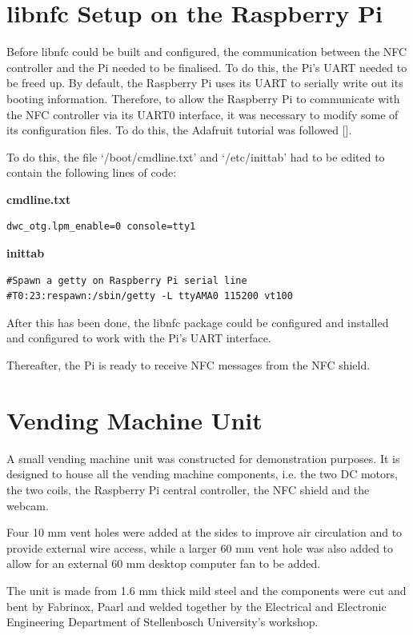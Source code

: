 \section{libnfc Setup on the Raspberry Pi}

Before libnfc could be built and configured, the communication between the NFC
controller and the Pi needed to be finalised. To do this, the Pi's UART needed
to be freed up. By default, the Raspberry Pi uses its UART to serially write out
its booting information. Therefore, to allow the Raspberry Pi to communicate
with the NFC controller via its UART0 interface, it was necessary to modify
some of its configuration files. To do this, the Adafruit tutorial was followed
[\cite{website:adafruit-tutorial}].

To do this, the file `/boot/cmdline.txt' and `/etc/inittab' had to be edited to
contain the following lines of code:

\textbf{cmdline.txt}
\begin{verbatim}
dwc_otg.lpm_enable=0 console=tty1
\end{verbatim}

\textbf{inittab}
\begin{verbatim}
#Spawn a getty on Raspberry Pi serial line
#T0:23:respawn:/sbin/getty -L ttyAMA0 115200 vt100
\end{verbatim}

After this has been done, the libnfc package could be configured and installed
and configured to work with the Pi's UART interface.

Thereafter, the Pi is ready to receive NFC messages from the
NFC shield.

\section{Vending Machine Unit}

A small vending machine unit was constructed for demonstration purposes. It is
designed to house all the vending machine components, i.e. the two DC motors,
the two coils, the Raspberry Pi central controller, the NFC shield and the
webcam.

Four 10 mm vent holes were added at the sides to improve air circulation
and to provide external wire access, while a larger 60 mm vent hole was also
added to allow for an external 60 mm desktop computer fan to be added. 

The unit is made from 1.6 mm thick mild steel and the components were cut and
bent by Fabrinox, Paarl and welded together by the Electrical and Electronic
Engineering Department of Stellenbosch University's workshop.

